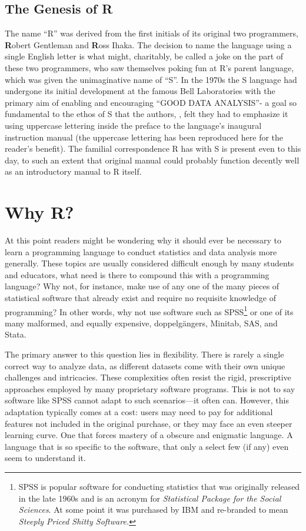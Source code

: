 \normalfont

\subsection{The Genesis of R}

The name ``R'' was derived from the first initials of its original two programmers, \textbf{R}obert Gentleman and \textbf{R}oss Ihaka.  The decision to name the language using a single English letter is what might, charitably, be called a joke on the part of these two programmers, who saw themselves poking fun at R's parent language, which was given the unimaginative name of ``S''. In the 1970s the S language had undergone its initial development at the famous Bell Laboratories with the primary aim of enabling and encouraging ``GOOD DATA ANALYSIS''- a goal so fundamental to the ethos of S that the authors, \textcite{Becker1984}, felt they had to emphasize it using uppercase lettering inside the preface to the language's inaugural instruction manual (the uppercase lettering has been reproduced here for the reader's benefit). The familial correspondence R has with S is present even to this day, to such an extent that \textcite{Becker1984} original manual could probably function decently well as an introductory manual to R itself.

\section{Why R?}

At this point readers might be wondering why it should ever be necessary to learn a programming language to conduct statistics and data analysis more generally. These topics are usually considered difficult enough by many students and educators, what need is there to compound this with a programming language? Why not, for instance, make use of any one of the many pieces of statistical software that already exist and require no requisite knowledge of programming? In other words, why not use software such as SPSS\footnote{SPSS is popular software for conducting statistics that was originally released in the late 1960s and is an acronym for \textit{Statistical Package for the Social Sciences}. At some point it was purchased by IBM and re-branded to mean \textit{Steeply Priced Shitty Software.}} or one of its many malformed, and equally expensive, doppelgängers, Minitab, SAS, and Stata.

The primary answer to this question lies in flexibility. There is rarely a single correct way to analyze data, as different datasets come with their own unique challenges and intricacies. These complexities often resist the rigid, prescriptive approaches employed by many proprietary software programs. This is not to say software like SPSS cannot adapt to such scenarios—it often can. However, this adaptation typically comes at a cost: users may need to pay for additional features not included in the original purchase, or they may face an even steeper learning curve. One that forces mastery of a obscure and enigmatic language. A language that is so specific to the software, that only a select few (if any) even seem to understand it.

